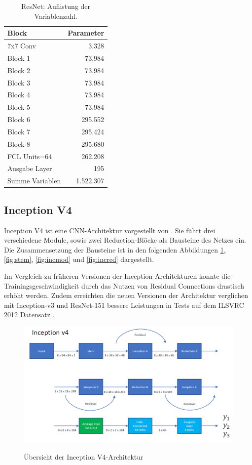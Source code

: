 \begin{table}
\centering
\caption{ResNet: Auflistung der Variablenzahl.}
\begin{tabular}{@{}lr@{}}
\hline
Block & Parameter\\
\hline
7x7 Conv &  3.328\\
Block 1 & 73.984\\
Block 2 & 73.984\\
Block 3 & 73.984\\
Block 4 & 73.984\\
Block 5 & 73.984\\
Block 6 & 295.552\\
Block 7 & 295.424\\
Block 8 & 295.680\\
FCL Units=64 & 262.208\\
Ausgabe Layer & 195\\
\hline
Summe Variablen & 1.522.307\\
\hline
\end{tabular}
\label{tb:resnet}
\end{table}

\subsection{Inception V4}
\label{sek:incv4}
Inception V4 ist eine CNN-Architektur vorgestellt von \textcite{DBLP:journals/corr/SzegedyIV16}. Sie f\"uhrt drei verschiedene Module, sowie zwei Reduction-Bl\"ocke als Bausteine des Netzes ein. Die Zusammensetzung der Bausteine ist in den folgenden Abbildungen \ref{fig:incv4}, \ref{fig:stem}, \ref{fig:incmod} und \ref{fig:incred} dargestellt.

Im Vergleich zu früheren Versionen der Inception-Architekturen konnte die Trainingsgeschwindigkeit durch das Nutzen von Residual Connections drastisch erhöht werden. Zudem erreichten die neuen Versionen der Architektur verglichen mit Inception-v3 und ResNet-151 bessere Leistungen in Tests auf dem ILSVRC 2012 Datensatz \parencite{DBLP:journals/corr/SzegedyIV16}.

\begin{figure}[H]
\centering
\caption[Caption for LOF]{Übersicht der Inception V4-Architektur}
\includegraphics[angle=90, scale=0.8]{pictures/inception/InceptionV4}
\label{fig:incv4}
\end{figure}

